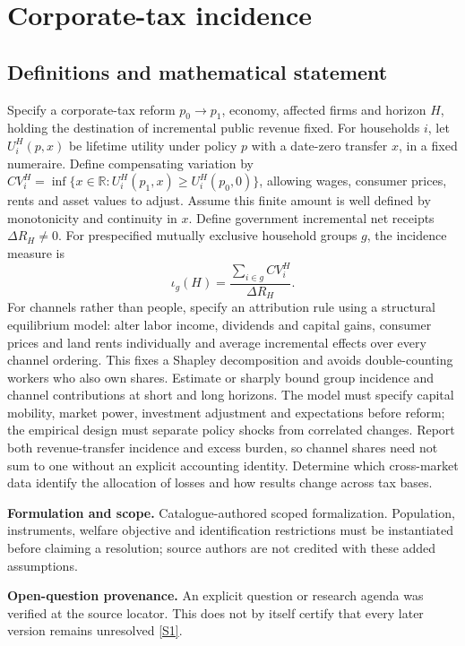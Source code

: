 \documentclass[11pt]{article}
\newcommand{\sref}[2]{\hyperlink{source:#1:#2}{[S#2]}}
\begin{document}
\section*{Corporate-tax incidence}\label{30007756}
\subsection{Definitions and mathematical statement}
Specify a corporate-tax reform \(p_0\to p_1\), economy, affected firms and horizon \(H\), holding the destination of incremental public revenue fixed. For households \(i\), let \(U_i^H(p,x)\) be lifetime utility under policy \(p\) with a date-zero transfer \(x\), in a fixed numeraire. Define compensating variation by \(CV_i^H=\inf\{x\in\mathbb R:U_i^H(p_1,x)\geq U_i^H(p_0,0)\}\), allowing wages, consumer prices, rents and asset values to adjust. Assume this finite amount is well defined by monotonicity and continuity in \(x\). Define government incremental net receipts \(\Delta R_H\neq0\). For prespecified mutually exclusive household groups \(g\), the incidence measure is
\[\iota_g(H)=\frac{\sum_{i\in g}CV_i^H}{\Delta R_H}.\]
For channels rather than people, specify an attribution rule using a structural equilibrium model: alter labor income, dividends and capital gains, consumer prices and land rents individually and average incremental effects over every channel ordering. This fixes a Shapley decomposition and avoids double-counting workers who also own shares. Estimate or sharply bound group incidence and channel contributions at short and long horizons. The model must specify capital mobility, market power, investment adjustment and expectations before reform; the empirical design must separate policy shocks from correlated changes. Report both revenue-transfer incidence and excess burden, so channel shares need not sum to one without an explicit accounting identity. Determine which cross-market data identify the allocation of losses and how results change across tax bases.

\par\textbf{Formulation and scope.} Catalogue-authored scoped formalization. Population, instruments, welfare objective and identification restrictions must be instantiated before claiming a resolution; source authors are not credited with these added assumptions.

\par\textbf{Open-question provenance.} An explicit question or research agenda was verified at the source locator. This does not by itself certify that every later version remains unresolved \sref{30007756}{1}.
\end{document}
